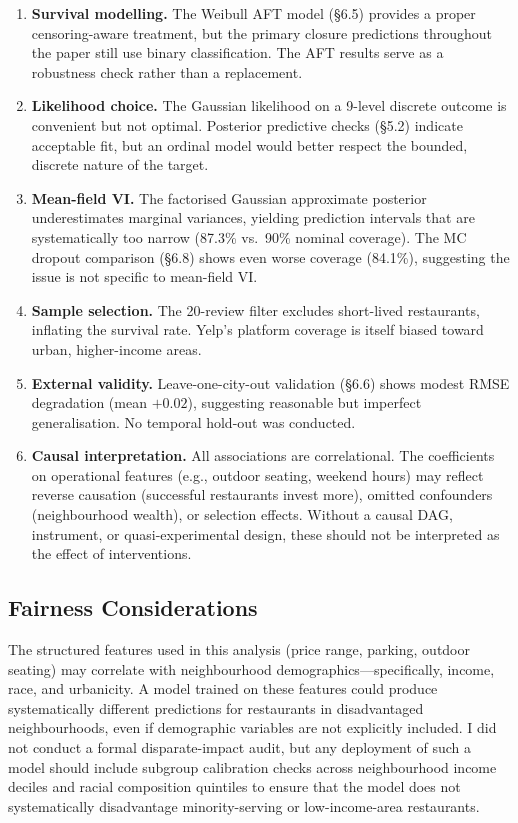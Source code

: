 \documentclass[10pt, letterpaper]{article}
\begin{document}
\begin{enumerate}
  \item \textbf{Survival modelling.} The Weibull AFT model (\S6.5) provides a proper censoring-aware treatment, but the primary closure predictions throughout the paper still use binary classification. The AFT results serve as a robustness check rather than a replacement.
  \item \textbf{Likelihood choice.} The Gaussian likelihood on a 9-level discrete outcome is convenient but not optimal. Posterior predictive checks (\S5.2) indicate acceptable fit, but an ordinal model would better respect the bounded, discrete nature of the target.
  \item \textbf{Mean-field VI.} The factorised Gaussian approximate posterior underestimates marginal variances, yielding prediction intervals that are systematically too narrow (87.3\% vs.\ 90\% nominal coverage). The MC dropout comparison (\S6.8) shows even worse coverage (84.1\%), suggesting the issue is not specific to mean-field VI.
  \item \textbf{Sample selection.} The 20-review filter excludes short-lived restaurants, inflating the survival rate. Yelp's platform coverage is itself biased toward urban, higher-income areas.
  \item \textbf{External validity.} Leave-one-city-out validation (\S6.6) shows modest RMSE degradation (mean $+0.02$), suggesting reasonable but imperfect generalisation. No temporal hold-out was conducted.
  \item \textbf{Causal interpretation.} All associations are correlational. The coefficients on operational features (e.g., outdoor seating, weekend hours) may reflect reverse causation (successful restaurants invest more), omitted confounders (neighbourhood wealth), or selection effects. Without a causal DAG, instrument, or quasi-experimental design, these should not be interpreted as the effect of interventions.
\end{enumerate}

\subsection{Fairness Considerations}

The structured features used in this analysis (price range, parking, outdoor seating) may correlate with neighbourhood demographics---specifically, income, race, and urbanicity. A model trained on these features could produce systematically different predictions for restaurants in disadvantaged neighbourhoods, even if demographic variables are not explicitly included. I did not conduct a formal disparate-impact audit, but any deployment of such a model should include subgroup calibration checks across neighbourhood income deciles and racial composition quintiles to ensure that the model does not systematically disadvantage minority-serving or low-income-area restaurants.
\end{document}
